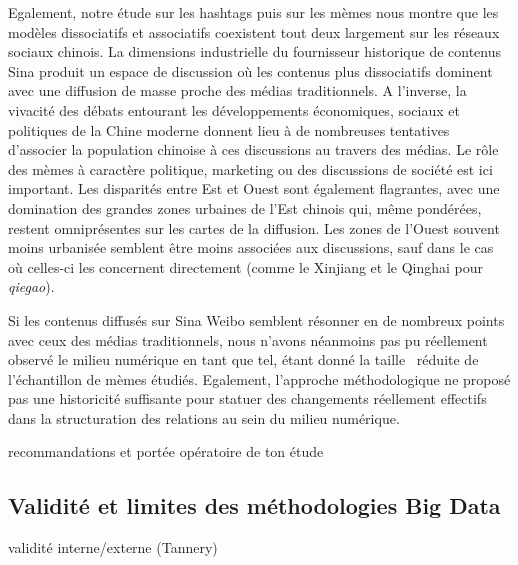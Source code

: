 Egalement, notre \'etude sur les hashtags puis sur les m\`emes nous montre que les mod\`eles dissociatifs et associatifs coexistent tout deux largement sur les r\'eseaux sociaux chinois. La dimensions industrielle du fournisseur historique de contenus Sina produit un espace de discussion o\`u les contenus plus dissociatifs dominent avec une diffusion de masse proche des m\'edias traditionnels. A l{\textquoteright}inverse, la vivacit\'e des d\'ebats entourant les d\'eveloppements \'economiques, sociaux et politiques de la Chine moderne donnent lieu \`a de nombreuses tentatives d{\textquoteright}associer la population chinoise \`a ces discussions au travers des m\'edias. Le r\^ole des m\`emes \`a caract\`ere politique, marketing ou des discussions de soci\'et\'e est ici important. Les disparit\'es entre Est et Ouest sont \'egalement flagrantes, avec une domination des grandes zones urbaines de l{\textquoteright}Est chinois qui, m\^eme pond\'er\'ees, restent omnipr\'esentes sur les cartes de la diffusion. Les zones de l{\textquoteright}Ouest souvent moins urbanis\'ee semblent \^etre moins associ\'ees aux discussions, sauf dans le cas o\`u celles-ci les concernent directement (comme le Xinjiang et le Qinghai pour \textit{qiegao}).

Si les contenus diffus\'es sur Sina Weibo semblent r\'esonner en de nombreux points avec ceux des m\'edias traditionnels, nous n{\textquoteright}avons n\'eanmoins pas pu r\'eellement observ\'e le milieu num\'erique en tant que tel, \'etant donn\'e la taille \ r\'eduite de l{\textquoteright}\'echantillon de m\`emes \'etudi\'es. Egalement, l{\textquoteright}approche m\'ethodologique ne propos\'e pas une historicit\'e suffisante pour statuer des changements r\'eellement effectifs dans la structuration des relations au sein du milieu num\'erique.
 

recommandations et portée opératoire de ton étude


\subsection[Validité et limites des méthodologies Big Data]{Validité et limites des méthodologies Big Data}


validité interne/externe (Tannery)


% 
% 
% 

